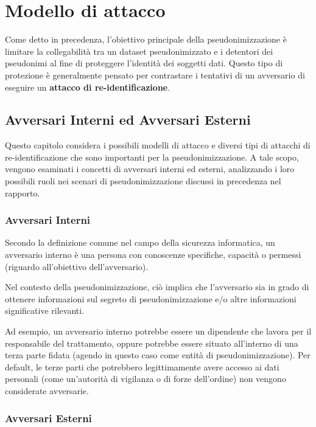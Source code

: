 \chapter{Modello di attacco}

Come detto in precedenza, l'obiettivo principale della pseudonimizzazione è limitare la collegabilità tra un dataset pseudonimizzato e i detentori dei pseudonimi al fine di proteggere l'identità dei soggetti dati. Questo tipo di protezione è generalmente pensato per contrastare i tentativi di un avversario di eseguire un \textbf{attacco di re-identificazione}.

\section{Avversari Interni ed Avversari Esterni}

Questo capitolo considera i possibili modelli di attacco e diversi tipi di attacchi di re-identificazione che sono importanti per la pseudonimizzazione. A tale scopo, vengono esaminati i concetti di avversari interni ed esterni, analizzando i loro possibili ruoli nei scenari di pseudonimizzazione discussi in precedenza nel rapporto. 

\subsection{Avversari Interni}

Secondo la definizione comune nel campo della sicurezza informatica, un avversario interno è una persona con conoscenze specifiche, capacità o permessi (riguardo all'obiettivo dell'avversario). 

Nel contesto della pseudonimizzazione, ciò implica che l'avversario sia in grado di ottenere informazioni sul segreto di pseudonimizzazione e/o altre informazioni significative rilevanti.

Ad esempio, un avversario interno potrebbe essere un dipendente che lavora per il responsabile del trattamento, oppure potrebbe essere situato all'interno di una terza parte fidata (agendo in questo caso come entità di pseudonimizzazione). Per default, le terze parti che potrebbero legittimamente avere accesso ai dati personali (come un'autorità di vigilanza o di forze dell'ordine) non vengono considerate avversarie.

\subsection{Avversari Esterni}

